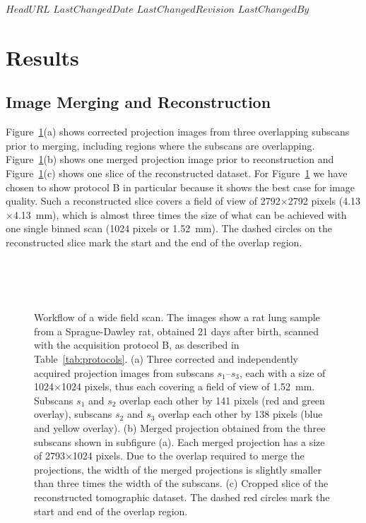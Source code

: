 \svnidlong
{$HeadURL$}
{$LastChangedDate$}
{$LastChangedRevision$}
{$LastChangedBy$}

\section{Results}\label{sec:Results}
\subsection{Image Merging and Reconstruction}\label{sec:Image Merging and Reconstruction}
Figure~\ref{fig:wide-field-scan-results}(a) shows corrected projection images from three overlapping subscans prior to merging, including regions where the subscans are overlapping. Figure~\ref{fig:wide-field-scan-results}(b) shows one merged projection image prior to reconstruction and Figure~\ref{fig:wide-field-scan-results}(c) shows one slice of the reconstructed dataset. For Figure~\ref{fig:wide-field-scan-results} we have chosen to show protocol B in particular because it shows the best case for image quality. Such a reconstructed slice covers a field of view of 2792$\times$2792 pixels (4.13$\times$\SI{4.13}{\milli\meter}), which is almost three times the size of what can be achieved with one single binned scan (1024 pixels or \SI{1.52}{\milli\meter}). %
The dashed circles on the reconstructed slice mark the start and the end of the overlap region.

\begin{figure}
	\centering
	\caption{Workflow of a wide field scan. The images show a rat lung sample from a Sprague-Dawley rat, obtained 21 days after birth, scanned with the acquisition protocol B, as described in Table~\ref{tab:protocols}. %
			(a) Three corrected and independently acquired projection images from subscans $s_1$--$s_3$, each with a size of 1024\(\times\)1024 pixels, thus each covering a field of view of \SI{1.52}{\milli\meter}. Subscans $s_1$ and $s_2$ overlap each other by 141 pixels (red and green overlay), subscans $s_2$ and $s_3$ overlap each other by 138 pixels (blue and yellow overlay). %
			(b) Merged projection obtained from the three subscans shown in subfigure (a). Each merged projection has a size of 2793\(\times\)1024 pixels. Due to the overlap required to merge the projections, the width of the merged projections is slightly smaller than three times the width of the subscans. %
			(c) Cropped slice of the reconstructed tomographic dataset. The dashed red circles mark the start and end of the overlap region.}
	\ifiucr
		\\%
		\\%
		\\%
	\else
	\fi
	\label{fig:wide-field-scan-results}
\end{figure}

